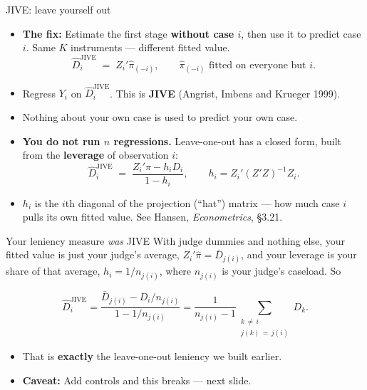 \documentclass[
  11pt,
  ignorenonframetext,
  aspectratio=169,
]{beamer}
\providecommand{\tightlist}{%
  \setlength{\itemsep}{0pt}\setlength{\parskip}{0pt}}
\begin{document}
\begin{frame}{JIVE: leave yourself out}
\protect{}\label{jive-leave-yourself-out}
\begin{itemize}
\tightlist
\item
  \textbf{The fix:} Estimate the first stage \textbf{without case
  \(i\)}, then use it to predict case \(i\). Same \(K\) instruments ---
  different fitted value. \[
  \hat D_i^{\text{JIVE}} \;=\; Z_i'\hat\pi_{(-i)} , \qquad \hat\pi_{(-i)} \text{ fitted on everyone but } i .
  \]
\item
  Regress \(Y_i\) on \(\hat D_i^{\text{JIVE}}\). This is \textbf{JIVE}
  (Angrist, Imbens and Krueger 1999).
\item
  Nothing about your own case is used to predict your own case.
\end{itemize}

\vspace{0.4em}

\begin{itemize}
\tightlist
\item
  \textbf{You do not run \(n\) regressions.} Leave-one-out has a closed
  form, built from the \textbf{leverage} of observation \(i\): \[
  \hat D_i^{\text{JIVE}} \;=\; \frac{Z_i'\hat\pi - h_i D_i}{1 - h_i},
  \qquad
  h_i = Z_i'(Z'Z)^{-1} Z_i .
  \]
\item
  \(h_i\) is the \(i\)th diagonal of the projection (``hat'') matrix ---
  how much case \(i\) pulls its own fitted value. See Hansen,
  \emph{Econometrics}, §3.21.
\end{itemize}
\end{frame}

\begin{frame}{Your leniency measure \emph{was} JIVE}
\protect{}\label{your-leniency-measure-was-jive}
With judge dummies and nothing else, your fitted value is just your
judge's average, \(Z_i'\hat\pi = \bar D_{j(i)}\), and your leverage is
your share of that average, \(h_i = 1/n_{j(i)}\), where \(n_{j(i)}\) is
your judge's caseload. So

\[
\hat D_i^{\text{JIVE}}
= \frac{\bar D_{j(i)} - D_i / n_{j(i)}}{1 - 1/n_{j(i)}}
= \frac{1}{n_{j(i)} - 1} \sum_{\substack{k \,\neq\, i \\ j(k) \,=\, j(i)}} D_k .
\]

\begin{itemize}
\tightlist
\item
  That is \textbf{exactly} the leave-one-out leniency we built earlier.
\item
  \textbf{Caveat:} Add controls and this breaks --- next slide.
\end{itemize}
\end{frame}
\end{document}
